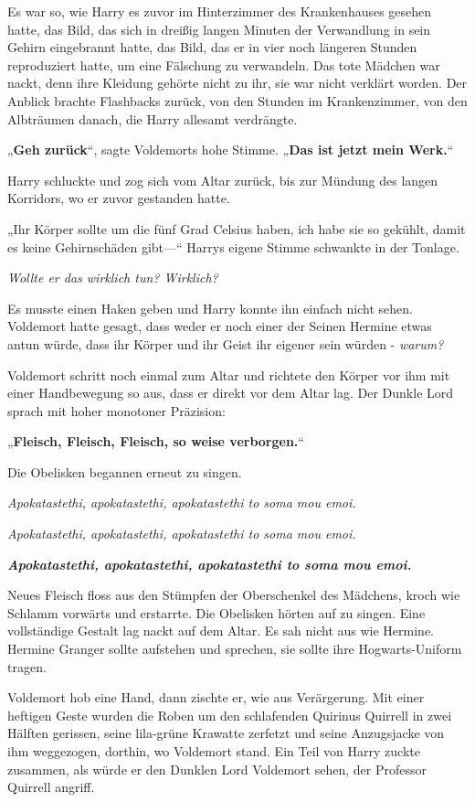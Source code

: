 {Es war so, wie Harry es zuvor im Hinterzimmer des Krankenhauses gesehen hatte, das Bild, das sich in dreißig langen Minuten der Verwandlung in sein Gehirn eingebrannt hatte, das Bild, das er in vier noch längeren Stunden reproduziert hatte, um eine Fälschung zu verwandeln. Das tote Mädchen war nackt, denn ihre Kleidung gehörte nicht zu ihr, sie war nicht verklärt worden. Der Anblick brachte Flashbacks zurück, von den Stunden im Krankenzimmer, von den Albträumen danach, die Harry allesamt verdrängte.

„\textbf{Geh zurück}“, sagte Voldemorts hohe Stimme. „\textbf{Das ist jetzt mein Werk.}“

Harry schluckte und zog sich vom Altar zurück, bis zur Mündung des langen Korridors, wo er zuvor gestanden hatte.

„Ihr Körper sollte um die fünf Grad Celsius haben, ich habe sie so gekühlt, damit es keine Gehirnschäden gibt—“ Harrys eigene Stimme schwankte in der Tonlage.

\emph{Wollte er das wirklich tun? Wirklich?}

Es musste einen Haken geben und Harry konnte ihn einfach nicht sehen. Voldemort hatte gesagt, dass weder er noch einer der Seinen Hermine etwas antun würde, dass ihr Körper und ihr Geist ihr eigener sein würden - \emph{warum?}

Voldemort schritt noch einmal zum Altar und richtete den Körper vor ihm mit einer Handbewegung so aus, dass er direkt vor dem Altar lag. Der Dunkle Lord sprach mit hoher monotoner Präzision:

„\textbf{Fleisch, Fleisch, Fleisch, so weise verborgen.}“

Die Obelisken begannen erneut zu singen.

\emph{Apokatastethi, apokatastethi, apokatastethi to soma mou emoi.}

\emph{Apokatastethi, apokatastethi, apokatastethi to soma mou emoi.}

\textbf{\emph{Apokatastethi, apokatastethi, apokatastethi to soma mou emoi.}}

Neues Fleisch floss aus den Stümpfen der Oberschenkel des Mädchens, kroch wie Schlamm vorwärts und erstarrte. Die Obelisken hörten auf zu singen. Eine vollständige Gestalt lag nackt auf dem Altar. Es sah nicht aus wie Hermine. Hermine Granger sollte aufstehen und sprechen, sie sollte ihre Hogwarts-Uniform tragen.

Voldemort hob eine Hand, dann zischte er, wie aus Verärgerung. Mit einer heftigen Geste wurden die Roben um den schlafenden Quirinus Quirrell in zwei Hälften gerissen, seine lila-grüne Krawatte zerfetzt und seine Anzugsjacke von ihm weggezogen, dorthin, wo Voldemort stand. Ein Teil von Harry zuckte zusammen, als würde er den Dunklen Lord Voldemort sehen, der Professor Quirrell angriff.

}
